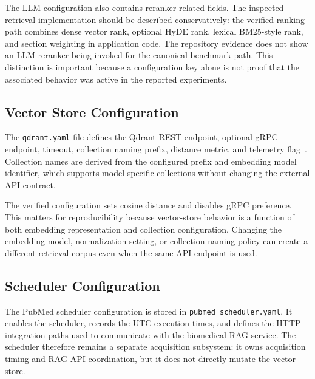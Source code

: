 The LLM configuration also contains reranker-related fields. The inspected retrieval implementation should be described conservatively: the verified ranking path combines dense vector rank, optional HyDE rank, lexical BM25-style rank, and section weighting in application code. The repository evidence does not show an LLM reranker being invoked for the canonical benchmark path. This distinction is important because a configuration key alone is not proof that the associated behavior was active in the reported experiments.

\subsection{Vector Store Configuration}

The \texttt{qdrant.yaml} file defines the Qdrant REST endpoint, optional gRPC endpoint, timeout, collection naming prefix, distance metric, and telemetry flag~\cite{qdrant2026collections}. Collection names are derived from the configured prefix and embedding model identifier, which supports model-specific collections without changing the external API contract.

The verified configuration sets cosine distance and disables gRPC preference. This matters for reproducibility because vector-store behavior is a function of both embedding representation and collection configuration. Changing the embedding model, normalization setting, or collection naming policy can create a different retrieval corpus even when the same API endpoint is used.

\subsection{Scheduler Configuration}

The PubMed scheduler configuration is stored in \texttt{pubmed\_scheduler.yaml}. It enables the scheduler, records the UTC execution times, and defines the HTTP integration paths used to communicate with the biomedical RAG service. The scheduler therefore remains a separate acquisition subsystem: it owns acquisition timing and RAG API coordination, but it does not directly mutate the vector store.

